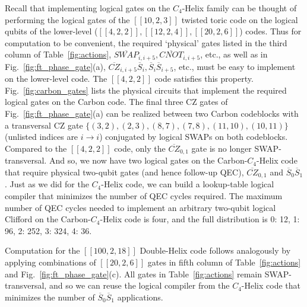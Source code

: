 Recall that implementing logical gates on the $C_4$-Helix family can be thought of performing the logical gates of the $[[10,2,3]]$ twisted toric code on the logical qubits of the lower-level ($[[4,2,2]], [[12,2,4]], [[20,2,6]]$) codes. Thus for computation to be convenient, the required `physical' gates listed in the third column of Table~\ref{fig:actions}, $\overline{SWAP}_{i,i+5}, \overline{CNOT}_{i,i+5}$, etc., as well as in Fig.~\ref{fig:ft_phase_gate}(a), $\overline{CZ}_{i, i+5} \overline{S}_i, \overline{S}_i \overline{S}_{i+5}$, etc., must be easy to implement on the lower-level code. The $[[4,2,2]]$ code satisfies this property. Fig.~\ref{fig:carbon_gates} lists the physical circuits that implement the required logical gates on the Carbon code. The final three CZ gates of Fig.~\ref{fig:ft_phase_gate}(a) can be realized between two Carbon codeblocks with a transversal CZ gate $\{(3,2),(2,3),(8,7),(7,8),(11,10),(10,11)\}$ (unlisted indices are $i \rightarrow i$) conjugated by logical SWAPs on both codeblocks. Compared to the $[[4,2,2]]$ code, only the $\overline{CZ}_{0,1}$ gate is no longer SWAP-transversal. And so, we now have two logical gates on the Carbon-$C_4$-Helix code that require physical two-qubit gates (and hence follow-up QEC), $\overline{CZ}_{0,1}$ and $\overline{S}_0 \overline{S}_1$. Just as we did for the $C_4$-Helix code, we can build a lookup-table logical compiler that minimizes the number of QEC cycles required. The maximum number of QEC cycles needed to implement an arbitrary two-qubit logical Clifford on the Carbon-$C_4$-Helix code is four, and the full distribution is 0: 12, 1: 96, 2: 252, 3: 324, 4: 36.

Computation for the $[[100,2,18]]$ Double-Helix code follows analogously by applying combinations of $[[20,2,6]]$ gates in fifth column of Table~\ref{fig:actions} and Fig.~\ref{fig:ft_phase_gate}(c). All gates in Table~\ref{fig:actions} remain SWAP-transversal, and so we can reuse the logical compiler from the $C_4$-Helix code that minimizes the number of $\overline{S}_0 \overline{S}_1$ applications.





